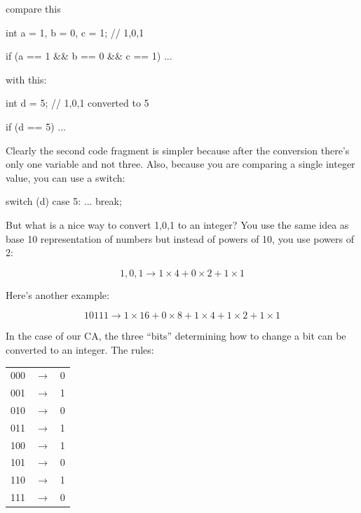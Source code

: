 compare this

\begin{consolethree}[escapeinside=||]
int a = 1, b = 0, c = 1; // 1,0,1

if (a == 1 && b == 0 && c == 1)
{
    ...
}
\end{consolethree}

with this:

\begin{consolethree}[escapeinside=||]
int d = 5; // 1,0,1 converted to 5

if (d == 5)
{
    ...
}
\end{consolethree}

Clearly the second code fragment is simpler because after the conversion there's only one variable and not three. Also, because you are comparing a single integer value, you can use a switch:

\begin{consolethree}[escapeinside=||]
switch (d)
{
    case 5:
        ...
        break;
}
\end{consolethree}

But what is a nice way to convert 1,0,1 to an integer? You use the same idea as base 10 representation of numbers but instead of powers of 10, you use powers of 2:
\begin{center}

\[1,0,1 \rightarrow 1 \times 4 + 0 \times 2 + 1 \times 1\]
\end{center}

Here's another example:
\begin{center}

\[10111 \rightarrow 1 \times 16 + 0 \times 8 + 1 \times 4 + 1 \times 2 + 1 \times 1\]
\end{center}

In the case of our CA, the three ``bits'' determining how to change a bit can be converted to an integer. The rules:

\begin{center}
\begin{tabular}{rcl}
000 & $\rightarrow$ & 0 \\
001 & $\rightarrow$ & 1 \\
010 & $\rightarrow$ & 0 \\
011 & $\rightarrow$ & 1 \\
100 & $\rightarrow$ & 1 \\
101 & $\rightarrow$ & 0 \\
110 & $\rightarrow$ & 1 \\
111 & $\rightarrow$ & 0 \\
\end{tabular}
\end{center}

